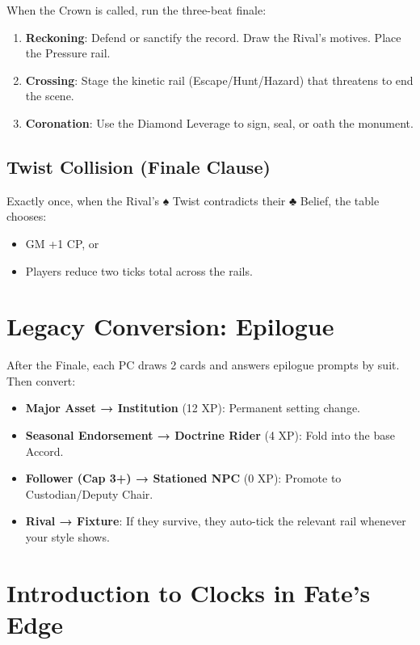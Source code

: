 When the Crown is called, run the three-beat finale:

\begin{enumerate}
    \item \textbf{Reckoning}: Defend or sanctify the record. Draw the Rival's motives. Place the Pressure rail.
    \item \textbf{Crossing}: Stage the kinetic rail (Escape/Hunt/Hazard) that threatens to end the scene.
    \item \textbf{Coronation}: Use the Diamond Leverage to sign, seal, or oath the monument.
\end{enumerate}

\subsection*{Twist Collision (Finale Clause)}

Exactly once, when the Rival's ♠ Twist contradicts their ♣ Belief, the table chooses:

\begin{itemize}
    \item GM +1 CP, or
    \item Players reduce two ticks total across the rails.
\end{itemize}

\section*{Legacy Conversion: Epilogue}

After the Finale, each PC draws 2 cards and answers epilogue prompts by suit. Then convert:

\begin{itemize}
    \item \textbf{Major Asset → Institution} (12 XP): Permanent setting change.
    \item \textbf{Seasonal Endorsement → Doctrine Rider} (4 XP): Fold into the base Accord.
    \item \textbf{Follower (Cap 3+) → Stationed NPC} (0 XP): Promote to Custodian/Deputy Chair.
    \item \textbf{Rival → Fixture}: If they survive, they auto-tick the relevant rail whenever your style shows.
\end{itemize}

\section*{Introduction to Clocks in Fate's Edge}

